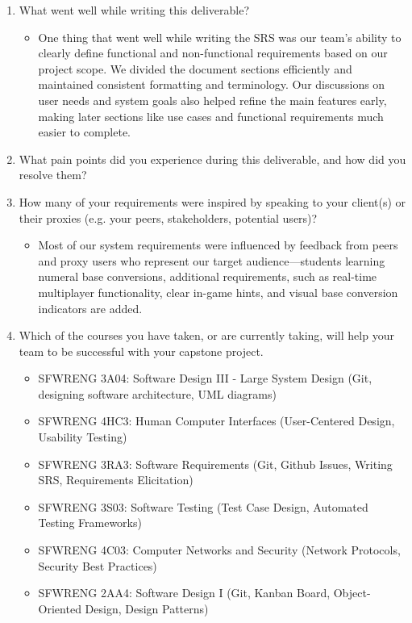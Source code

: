 \begin{enumerate}
  \item What went well while writing this deliverable?
  \begin{itemize}
  \item One thing that went well while writing the SRS was our team’s ability to clearly define
  functional and non-functional requirements based on our project scope.
  We divided the document sections efficiently and maintained consistent formatting and terminology.
  Our discussions on user needs and system goals also helped refine the main features early,
  making later sections like use cases and functional requirements much easier to complete.
  \end{itemize}

  \item What pain points did you experience during this deliverable, and how did
  you resolve them?
  \item How many of your requirements were inspired by speaking to your
  client(s) or their proxies (e.g. your peers, stakeholders, potential users)?
\begin{itemize}
\item Most of our system requirements were influenced by feedback from peers and proxy users who represent our target audience—students learning numeral base conversions, additional requirements, such as real-time multiplayer functionality, clear in-game hints, and visual base conversion indicators are added.
\end{itemize}
  \item Which of the courses you have taken, or are currently taking, will help
  your team to be successful with your capstone project.
\begin{itemize}
\item SFWRENG 3A04: Software Design III - Large System Design (Git, designing software architecture, UML diagrams)
\item SFWRENG 4HC3: Human Computer Interfaces (User-Centered Design, Usability Testing)
\item SFWRENG 3RA3: Software Requirements (Git, Github Issues, Writing SRS, Requirements Elicitation)
\item SFWRENG 3S03: Software Testing (Test Case Design, Automated Testing Frameworks)
\item SFWRENG 4C03: Computer Networks and Security (Network Protocols, Security Best Practices)
\item SFWRENG 2AA4: Software Design I (Git, Kanban Board, Object-Oriented Design, Design Patterns)
\end{itemize}


\end{enumerate}
